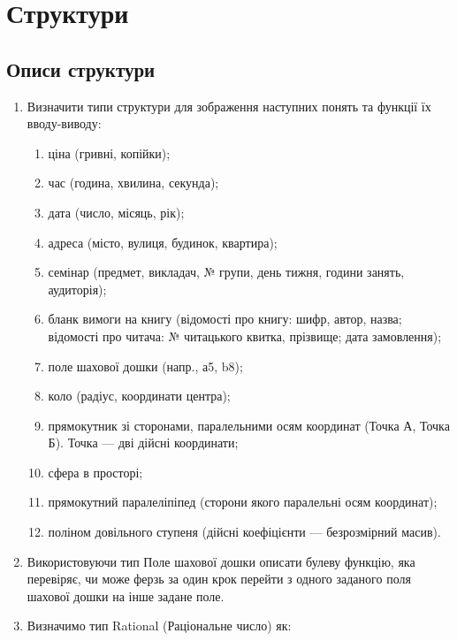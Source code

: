 \documentclass[]{article}
\makeatletter
\newcommand{\xslalph}[1]{\expandafter\@xslalph\csname c@#1\endcsname}
\newcommand{\@xslalph}[1]{%
    \ifcase#1\or а\or б\or в\or г\or д\or e\or є\or ж\or з\or i%
    \or й\or к\or л\or м\or н\or о\or п\or р\or с\or т%
    \or у\or ф\or х\or ц\or ч\or ш\or ю\or я\or аа\or бб\or вв %
    \else\@ctrerr\fi%
}
\makeatother
\begin{document}
\section{Структури}

\subsection{ Описи структури}
\begin{enumerate}
\item
Визначити типи структури для зображення наступних понять та функції їх
вводу-виводу:
\begin{enumerate}[label=\xslalph*)]
\item ціна (гривні, копійки);

\item час (година, хвилина, секунда);

\item дата (число, місяць, рік);

\item адреса (місто, вулиця, будинок, квартира);

\item семінар (предмет, викладач, № групи, день тижня, години занять,
аудиторія);

\item бланк вимоги на книгу (відомості про книгу: шифр, автор, назва;
відомості про читача: № читацького квитка, прізвище; дата замовлення);

\item поле шахової дошки (напр., а5, b8);

\item коло (радіус, координати центра);

\item прямокутник зі сторонами, паралельними осям координат (Точка А, Точка
Б). Точка --- дві дійсні координати;
\item
сфера в просторі;
\item
прямокутний паралеліпіпед (сторони якого паралельні осям координат);
\item
поліном довільного ступеня (дійсні коефіцієнти --- безрозмірний масив).
\end{enumerate}

\item
Використовуючи тип Поле шахової дошки описати булеву функцію, яка
перевіряє, чи може ферзь за один крок перейти з одного заданого поля
шахової дошки на інше задане поле.
\item
Визначимо тип Rational (Раціональне число) як:


\end{enumerate}
\end{document}
